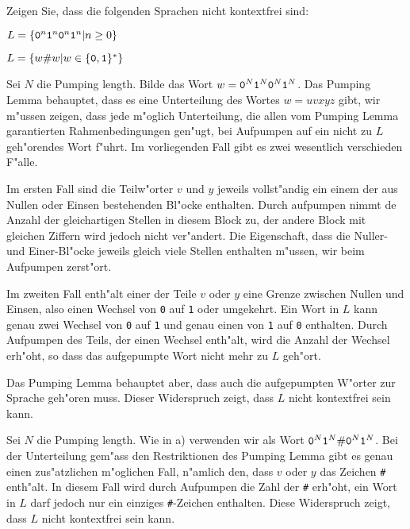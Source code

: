 Zeigen Sie, dass die folgenden Sprachen nicht kontextfrei sind:
\begin{teilaufgaben}
\item $L=\{{\tt 0}^n{\tt 1}^n{\tt 0}^n{\tt 1}^n|n\ge 0\}$
\item $L=\{w{\tt \#}w|w\in\{{\tt 0},{\tt 1}\}^*\}$
\end{teilaufgaben}

\begin{loesung}
\begin{teilaufgaben}
\item Sei $N$ die Pumping length.
Bilde das Wort $w={\tt 0}^N{\tt 1}^N{\tt 0}^N{\tt 1}^N$. Das Pumping Lemma
behauptet, dass es eine Unterteilung des Wortes $w=uvxyz$ gibt, wir
m"ussen zeigen, dass jede m"oglich Unterteilung, die allen vom
Pumping Lemma garantierten Rahmenbedingungen gen"ugt, bei Aufpumpen
auf ein nicht zu $L$ geh"orendes Wort f"uhrt. Im vorliegenden Fall
gibt es zwei wesentlich verschieden F"alle.

Im ersten Fall sind die
Teilw"orter $v$ und $y$ jeweils vollst"andig ein einem der aus Nullen
oder Einsen bestehenden Bl"ocke enthalten. Durch aufpumpen nimmt de
Anzahl der gleichartigen Stellen in diesem Block zu, der andere Block
mit gleichen Ziffern wird jedoch nicht ver"andert. Die Eigenschaft,
dass die Nuller- und
Einer-Bl"ocke jeweils gleich viele Stellen enthalten m"ussen, wir
beim Aufpumpen zerst"ort.

Im zweiten Fall enth"alt einer der Teile $v$ oder $y$ eine
Grenze zwischen Nullen und Einsen, also einen Wechsel von
{\tt 0} auf {\tt 1} oder umgekehrt. Ein Wort in $L$ kann
genau zwei Wechsel von {\tt 0} auf {\tt 1} und genau einen
von {\tt 1} auf {\tt 0} enthalten. Durch Aufpumpen des Teils,
der einen Wechsel enth"alt, wird die Anzahl der Wechsel erh"oht,
so dass das aufgepumpte Wort nicht mehr zu $L$ geh"ort.

Das Pumping Lemma behauptet aber, dass auch die aufgepumpten W"orter
zur Sprache geh"oren muss. Dieser Widerspruch zeigt, dass $L$
nicht kontextfrei sein kann.
\item Sei $N$ die Pumping length. Wie in a) verwenden wir als
Wort ${\tt 0}^N{\tt 1}^N{\tt\#}{\tt 0}^N{\tt 1}^N$. Bei der Unterteilung
gem"ass den Restriktionen des Pumping Lemma gibt es genau einen zus"atzlichen
m"oglichen Fall, n"amlich den, dass $v$ oder $y$ das Zeichen {\tt\#}
enth"alt. In diesem Fall wird durch Aufpumpen die Zahl der {\tt\#}
erh"oht, ein Wort in $L$ darf jedoch nur ein einziges {\tt\#}-Zeichen
enthalten. Diese Widerspruch zeigt, dass $L$ nicht kontextfrei sein kann.
\end{teilaufgaben}
\end{loesung}
